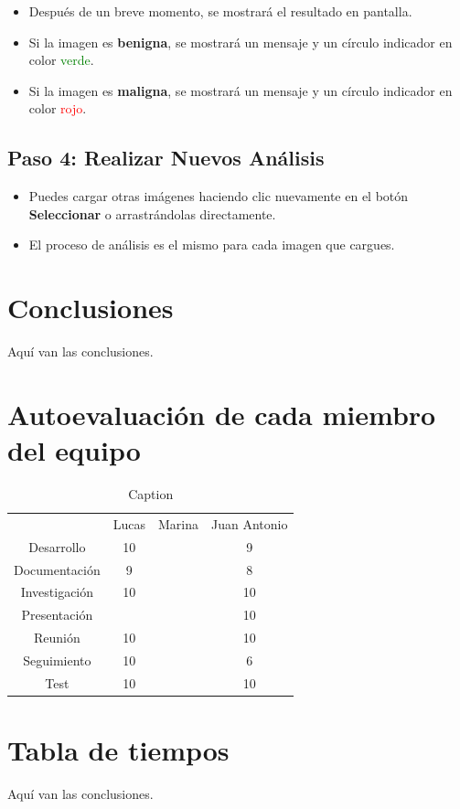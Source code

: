 \documentclass[12pt]{article} %
\begin{document}
\begin{itemize}
    \item Después de un breve momento, se mostrará el resultado en pantalla.
    \item Si la imagen es \textbf{benigna}, se mostrará un mensaje y un círculo indicador en color \textcolor{green}{verde}.
    \item Si la imagen es \textbf{maligna}, se mostrará un mensaje y un círculo indicador en color \textcolor{red}{rojo}.
\end{itemize}

\subsection*{Paso 4: Realizar Nuevos Análisis}

\begin{itemize}
    \item Puedes cargar otras imágenes haciendo clic nuevamente en el botón \textbf{Seleccionar} o arrastrándolas directamente.
    \item El proceso de análisis es el mismo para cada imagen que cargues.
\end{itemize}


\section{Conclusiones}
Aquí van las conclusiones.

\section{Autoevaluación de cada miembro del equipo}


\begin{table}
    \centering
    \begin{tabular}{cccc}
         &  Lucas&  Marina& Juan Antonio\\
         Desarrollo&  10&  & 9\\
         Documentación&  9&  & 8\\
         Investigación&  10&  & 10\\
         Presentación&  &  & 10\\
         Reunión&  10&  & 10\\
         Seguimiento&  10&  & 6\\
         Test&  10&  & 10\\
    \end{tabular}
    \caption{Caption}
    \label{tab:my_label}
\end{table}


\section{Tabla de tiempos}
Aquí van las conclusiones.

\printbibliography
\end{document}
